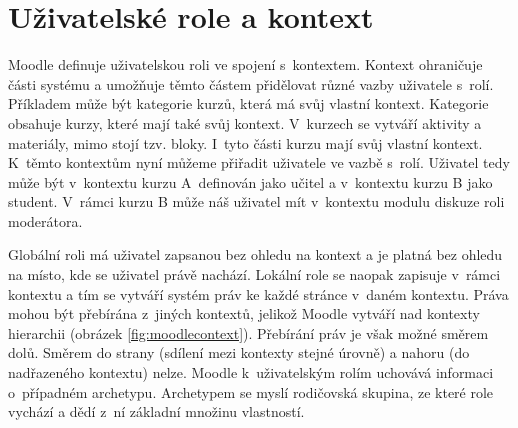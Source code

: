 \documentclass[
print,
  11pt,
  table,   
  nolof,    
  nolot,
  oneside,final
]{fithesis3}
\begin{document}
	\section{Uživatelské role a kontext}
Moodle definuje uživatelskou roli ve spojení s~kontextem. Kontext ohraničuje části systému a umožňuje těmto částem přidělovat různé vazby uživatele s~rolí. Příkladem může být kategorie kurzů, která má svůj vlastní kontext. Kategorie obsahuje kurzy, které mají také svůj kontext. V~kurzech se vytváří aktivity a materiály, mimo stojí tzv. bloky. I~tyto části kurzu mají svůj vlastní kontext. K~těmto kontextům nyní můžeme přiřadit uživatele ve vazbě s~rolí. Uživatel tedy může být v~kontextu kurzu A~definován jako učitel a v~kontextu kurzu B jako student. V~rámci kurzu B může náš uživatel mít v~kontextu modulu diskuze roli moderátora. 

Globální roli má uživatel zapsanou bez ohledu na kontext a je platná bez ohledu na místo, kde se uživatel právě nachází. Lokální role se naopak zapisuje v~rámci kontextu a tím se vytváří systém práv ke každé stránce v~daném kontextu. Práva mohou být přebírána z~jiných kontextů, jelikož Moodle vytváří nad kontexty hierarchii (obrázek \ref{fig:moodlecontext}). Přebírání práv je však možné směrem dolů. Směrem do strany (sdílení mezi kontexty stejné úrovně) a nahoru (do nadřazeného kontextu) nelze. Moodle k~uživatelským rolím uchovává informaci o~případném archetypu. Archetypem se myslí rodičovská skupina, ze které role vychází a dědí z~ní základní množinu vlastností. 
 
\end{document}
